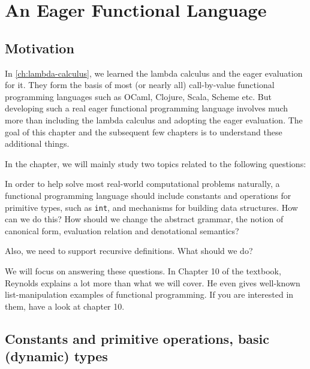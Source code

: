 \chapter{An Eager Functional Language}

\section{Motivation}

\begin{enumcirc}
	\item
	In \cref{ch:lambda-calculus}, we learned the lambda calculus and the eager
	evaluation for it.
	They form the basis of most (or nearly all) call-by-value functional
	programming languages such as OCaml, Clojure, Scala, Scheme etc.
	But developing such a real eager functional programming language involves much
	more than including the lambda calculus and adopting the eager evaluation.
	The goal of this chapter and the subsequent few chapters is to understand these
	additional things.
	\item
	In the chapter, we will mainly study two topics related to the following
	questions:
	\begin{enumrm}
		\item
		In order to help solve most real-world computational problems naturally, a
		functional programming language should include constants and operations for
		primitive types, such as \texttt{int}, and mechanisms for building data
		structures.
		How can we do this?
		How should we change the abstract grammar, the notion of canonical form,
		evaluation relation and denotational semantics?
		\item
		Also, we need to support recursive definitions.
		What should we do?
	\end{enumrm}
	\item
	We will focus on answering these questions.
	In Chapter 10 of the textbook, Reynolds explains a lot more than what we will
	cover.
	He even gives well-known list-manipulation examples of functional programming.
	If you are interested in them, have a look at chapter 10.
\end{enumcirc}

\section{Constants and primitive operations, basic (dynamic) types}

